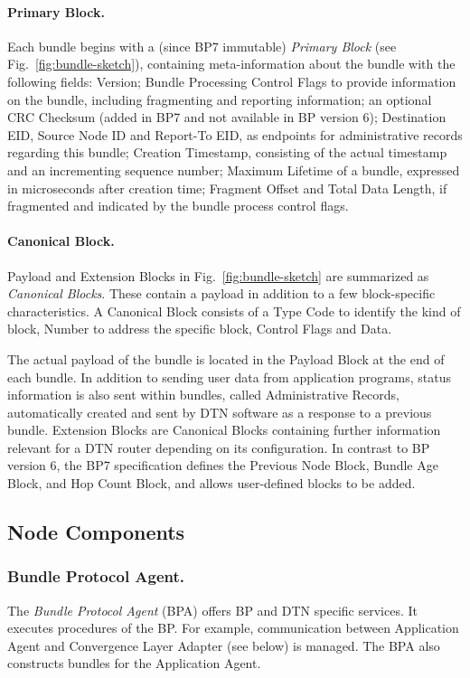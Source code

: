 \paragraph{Primary Block.}

Each bundle begins with a (since BP7 immutable) \textit{Primary Block} (see  Fig.~\ref{fig:bundle-sketch}),  containing 
meta-information about the bundle with the following fields:
Version;
Bundle Processing Control Flags to provide information on the bundle, including fragmenting and reporting information;
an optional CRC Checksum (added in BP7 and not available in BP version 6);
Destination EID, Source Node ID and Report-To EID, as  endpoints for administrative records regarding this bundle;
Creation Timestamp, consisting of the actual timestamp and an incrementing sequence number;
Maximum Lifetime of a bundle, expressed in microseconds after creation time;
Fragment Offset and Total Data Length, if fragmented and indicated by the bundle process control flags.

\paragraph{Canonical Block.}
Payload and Extension Blocks in Fig.~\ref{fig:bundle-sketch} are summarized as \textit{Canonical Blocks}. 
These contain a payload in addition to a few block-specific characteristics.
A Canonical Block consists of a Type Code to identify the kind of block, Number to address the specific block, Control Flags and Data. 

The actual payload of the bundle is located in the Payload Block at the end of each bundle.
In addition to sending user data from application programs, status information is also sent within bundles, called Administrative Records, automatically created and sent by DTN software as a response to a previous bundle. 
Extension Blocks are Canonical Blocks containing further information relevant for a DTN router depending on its configuration.
In contrast to BP version 6, the BP7 specification defines the Previous Node Block, Bundle Age Block, and Hop Count Block, and allows user-defined blocks to be added.



\subsection{Node Components}

\subsubsection{Bundle Protocol Agent.}
The \textit{Bundle Protocol Agent} (BPA) offers BP and DTN specific services.
It executes procedures of the BP.
For example, communication between Application Agent and Convergence Layer Adapter (see below) is managed.
The BPA also constructs bundles for the Application Agent.

